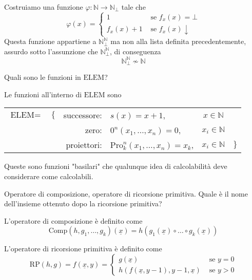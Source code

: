 \documentclass[12pt, answers]{exam}
\theoremstyle{plain}
\newcommand{\elem}{\text{ELEM}}
\newcommand{\comp}{\text{Comp}}
\newcommand{\rp}{\text{RP}}
\newcommand{\N}{\mathbb{N}}
\newcommand{\pro}{\text{Pro}}
\begin{document}
\begin{questions}
\begin{solution}
            Costruiamo una funzione $\varphi: \N \rightarrow \N_\bot$ tale che
            $$ \varphi (x) = \begin{cases}
                1 & \text{ se } f_x(x) = \bot \\
                f_x(x) + 1 & \text{ se } f_x(x) \downarrow
            \end{cases}$$
            Questa funzione appartiene a $\N_\bot^\N$ ma non alla lista definita precedentemente, assurdo sotto l'assunzione che $\N_\bot^\N$, di conseguenza
            $$ \N_\bot^\N \nsim \N $$
        \end{solution}
        
        \question Quali sono le funzioni in $\elem$?
        
        \begin{solution}
            Le funzioni all'interno di $\elem$ sono
            \begin{center}
                \begin{tabular}{r c r l c l}
                    $\elem = $ & $\{$ & successore: & $s(x) = x + 1$, & $x \in \N$ & \\
                    && zero: & $0^n (x_1, \dots, x_n) = 0$, & $x_i \in \N$ & \\
                    && proiettori: & $\pro_k^n (x_1, \dots, x_n) = x_k$, & $x_i \in \N$& $\}$ \\
                \end{tabular}
            \end{center}
            
            Queste sono funzioni "basilari" che qualunque idea di calcolabilità deve considerare come calcolabili.
        \end{solution}
        
        \question Operatore di composizione, operatore di ricorsione primitiva. Quale è il nome dell'insieme ottenuto dopo la ricorsione primitiva?
        
        \begin{solution}
            L'operatore di composizione è definito come
            $$ \comp (h, g_1, \dots, g_k) (\underline{x}) = h(g_1 (\underline{x}) \circ \dots \circ g_k (\underline{x})) $$
            
            L'operatore di ricorsione primitiva è definito come
            $$
            \rp(h,g) = f(\underline{x}, y) = \begin{cases}
                g(\underline{x}) & \text{ se } y = 0 \\
                h(f(\underline{x}, y-1), y-1, \underline{x}) & \text{ se } y > 0 
            \end{cases}
            $$
            

\end{solution}
\end{questions}
\end{document}
